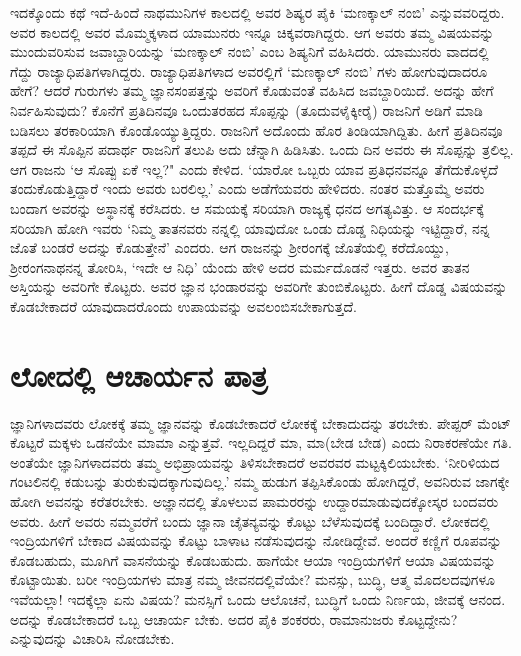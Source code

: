 ಇದಕ್ಕೊಂದು ಕಥೆ ಇದೆ-ಹಿಂದೆ ನಾಥಮುನಿಗಳ ಕಾಲದಲ್ಲಿ ಅವರ ಶಿಷ್ಯರ ಪೈಕಿ `ಮಣಕ್ಕಾಲ್ ನಂಬಿ' ಎನ್ನುವವರಿದ್ದರು. ಅವರ ಕಾಲದಲ್ಲಿ ಅವರ ಮೊಮ್ಮಕ್ಕಳಾದ ಯಾಮುನರು ಇನ್ನೂ ಚಿಕ್ಕವರಾಗಿದ್ದರು. ಆಗ ಅವರು ತಮ್ಮ ವಿಷಯವನ್ನು  ಮುಂದುವರಿಸುವ  ಜವಾಬ್ದಾರಿಯನ್ನು `ಮಣಕ್ಕಾಲ್ ನಂಬಿ' ಎಂಬ ಶಿಷ್ಯನಿಗೆ ವಹಿಸಿದರು. ಯಾಮುನರು ವಾದದಲ್ಲಿ ಗೆದ್ದು ರಾಜ್ಯಾಧಿಪತಿಗಳಾಗಿದ್ದರು. ರಾಜ್ಯಾಧಿಪತಿಗಳಾದ ಅವರಲ್ಲಿಗೆ `ಮಣಕ್ಕಾಲ್ ನಂಬಿ' ಗಳು ಹೋಗುವುದಾದರೂ ಹೇಗೆ? ಆದರೆ ಗುರುಗಳು ತಮ್ಮ ಜ್ಞಾನಸಂಪತ್ತನ್ನು ಅವರಿಗೆ ಕೊಡುವಂತೆ ವಹಿಸಿದ ಜವಬ್ದಾರಿಯಿದೆ. ಅದನ್ನು ಹೇಗೆ ನಿರ್ವಹಿಸುವುದು? ಕೊನೆಗೆ ಪ್ರತಿದಿನವೂ ಒಂದುತರಹದ ಸೊಪ್ಪನ್ನು  (ತೂದುವಳೈಕ್ಕೀರೈ) ರಾಜನಿಗೆ ಅಡಿಗೆ ಮಾಡಿ ಬಡಿಸಲು ತರಕಾರಿಯಾಗಿ ಕೊಂಡೊಯ್ಯುತ್ತಿದ್ದರು. ರಾಜನಿಗೆ ಅದೊಂದು ಹೊರ ತಿಂಡಿಯಾಗಿದ್ದಿತು. ಹೀಗೆ ಪ್ರತಿದಿನವೂ ತಪ್ಪದೆ ಈ ಸೊಪ್ಪಿನ ಪದಾರ್ಥ ರಾಜನಿಗೆ ತಲುಪಿ ಅದು ಚೆನ್ನಾಗಿ ಹಿಡಿಸಿತು. ಒಂದು ದಿನ ಅವರು ಈ ಸೊಪ್ಪನ್ನು ತ್ರಲಿಲ್ಲ. ಆಗ ರಾಜನು `ಆ ಸೊಪ್ಪು  ಏಕೆ ಇಲ್ಲ?" ಎಂದು ಕೇಳಿದ. `ಯಾರೋ ಒಬ್ಬರು ಯಾವ ಪ್ರತಿಧನವನ್ನೂ ತೆಗೆದುಕೊಳ್ಳದೆ ತಂದುಕೊಡುತ್ತಿದ್ದಾರೆ ಇಂದು ಅವರು ಬರಲಿಲ್ಲ.' ಎಂದು ಅಡೆಗೆಯವರು ಹೇಳಿದರು. ನಂತರ ಮತ್ತೊಮ್ಮೆ ಅವರು ಬಂದಾಗ ಅವರನ್ನು ಅಸ್ಥಾನಕ್ಕೆ ಕರೆಸಿದರು. ಆ ಸಮಯಕ್ಕೆ ಸರಿಯಾಗಿ ರಾಜ್ಯಕ್ಕೆ ಧನದ ಅಗತ್ಯವಿತ್ತು. ಆ ಸಂದರ್ಭಕ್ಕೆ ಸರಿಯಾಗಿ ಹೋಗಿ ಇವರು `ನಿಮ್ಮ ತಾತನವರು ನನ್ನಲ್ಲಿ ಯಾವುದೋ ಒಂಡು ದೊಡ್ಡ ನಿಧಿಯನ್ನು ಇಟ್ಟಿದ್ದಾರೆ, ನನ್ನ ಜೊತೆ ಬಂಡರೆ ಅದನ್ನು ಕೊಡುತ್ತೇನೆ' ಎಂದರು. ಆಗ ರಾಜನನ್ನು ಶ್ರೀರಂಗಕ್ಕೆ  ಜೊತೆಯಲ್ಲಿ ಕರೆದೊಯ್ದು, ಶ್ರೀರಂಗನಾಥನನ್ನ ತೋರಿಸಿ, `ಇದೇ ಆ ನಿಧಿ' ಯೆಂದು ಹೇಳಿ ಅದರ ಮರ್ಮದೊಡನೆ ಇತ್ತರು. ಅವರ ತಾತನ ಅಸ್ತಿಯನ್ನು ಅವರಿಗೇ ಕೊಟ್ಟರು. ಅವರ ಜ್ಞಾನ ಭಂಡಾರವನ್ನು ಅವರಿಗೇ ತುಂಬಿಕೊಟ್ಟರು. ಹೀಗೆ ದೊಡ್ಡ ವಿಷಯವನ್ನು ಕೊಡಬೇಕಾದರೆ ಯಾವುದಾದರೊಂದು ಉಪಾಯವನ್ನು ಅವಲಂಬಿಸಬೇಕಾಗುತ್ತದೆ.

\section*{ಲೋದಲ್ಲಿ ಆಚಾರ್ಯನ ಪಾತ್ರ}

ಜ್ಞಾನಿಗಳಾದವರು ಲೋಕಕ್ಕೆ ತಮ್ಮ ಜ್ಞಾನವನ್ನು ಕೊಡಬೇಕಾದರೆ ಲೋಕಕ್ಕೆ ಬೇಕಾದುದನ್ನು ತರಬೇಕು. ಪೇಪ್ಪರ್ ಮೆಂಟ್ ಕೊಟ್ಟರೆ ಮಕ್ಕಳು ಒಡನೆಯೇ ಮಾಮಾ ಎನ್ನುತ್ತವೆ. ಇಲ್ಲದಿದ್ದರೆ ಮಾ, ಮಾ(ಬೇಡ ಬೇಡ) ಎಂದು ನಿರಾಕರಣೆಯೇ ಗತಿ. ಅಂತೆಯೇ ಜ್ಞಾನಿಗಳಾದವರು ತಮ್ಮ ಅಭಿಪ್ರಾಯವನ್ನು ತಿಳಿಸಬೇಕಾದರೆ ಅವರವರ ಮಟ್ಟಕ್ಕಿಲಿಯಬೇಕು. `ನೀರಿಳಿಯದ ಗಂಟಲಿನಲ್ಲಿ ಕಡುಬನ್ನು ತುರುಕುವುದಕ್ಕಾಗುವುದಿಲ್ಲ.' ನಮ್ಮ ಹುಡುಗ ತಪ್ಪಿಸಿಕೊಂಡು ಹೋಗಿದ್ದರೆ, ಅವನಿರುವ ಜಾಗಕ್ಕೇ ಹೋಗಿ ಅವನನ್ನು ಕರೆತರಬೇಕು. ಅಜ್ಞಾನದಲ್ಲಿ ತೊಳಲುವ ಪಾಮರರನ್ನು ಉದ್ದಾರಮಾಡುವುದಕ್ಕೋಸ್ಕರ ಬಂದವರು ಅವರು. ಹೀಗೆ ಅವರು ನಮ್ಮವರೆಗೆ ಬಂದು ಜ್ಞಾನಾ ಚೈತನ್ಯವನ್ನು ಕೊಟ್ಟು ಬೆಳೆಸುವುದಕ್ಕೆ ಬಂದಿದ್ದಾರೆ. ಲೋಕದಲ್ಲಿ ಇಂದ್ರಿಯಗಳಿಗೆ ಬೇಕಾದ ವಿಷಯವನ್ನು ಕೊಟ್ಟು ಬಾಳಾಟ ನಡೆಸುವುದನ್ನು ನೋಡಿದ್ದೇವೆ. ಅಂದರೆ ಕಣ್ಣಿಗೆ ರೂಪವನ್ನು ಕೊಡಬಹುದು, ಮೂಗಿಗೆ ವಾಸನೆಯನ್ನು ಕೊಡಬಹುದು. ಹಾಗೆಯೇ ಆಯಾ ಇಂದ್ರಿಯಗಳಿಗೆ ಆಯಾ ವಿಷಯವನ್ನು  ಕೊಟ್ಟಾಯಿತು. ಬರೀ ಇಂದ್ರಿಯಗಳು ಮಾತ್ರ ನಮ್ಮ ಜೀವನದಲ್ಲಿವೆಯೇ? ಮನಸ್ಸು, ಬುದ್ಧಿ, ಆತ್ಮ ಮೊದಲದವುಗಳೂ ಇವೆಯಲ್ಲಾ! ಇದಕ್ಕೆಲ್ಲಾ ಏನು ವಿಷಯ? ಮನಸ್ಸಿಗೆ ಒಂದು ಆಲೊಚನೆ, ಬುದ್ಧಿಗೆ ಒಂದು ನಿರ್ಣಯ, ಜೀವಕ್ಕೆ ಆನಂದ. ಅದನ್ನು ಕೊಡಬೇಕಾದರೆ ಒಬ್ಬ ಆಚಾರ್ಯ ಬೇಕು. ಅದರ ಪೈಕಿ ಶಂಕರರು, ರಾಮಾನುಜರು ಕೊಟ್ಟದ್ದೇನು? ಎನ್ನುವುದನ್ನು ವಿಚಾರಿಸಿ ನೋಡಬೇಕು. 

